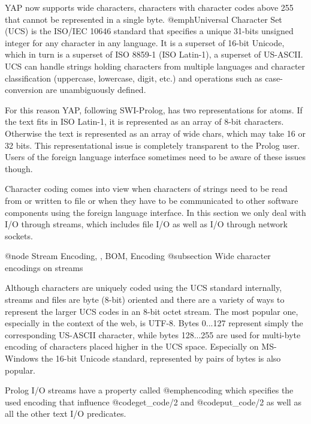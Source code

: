 {{{{YAP now  supports wide characters, characters with character
codes above 255 that cannot be represented in a single byte.
@emph{Universal Character Set} (UCS) is the ISO/IEC 10646 standard
that specifies a unique 31-bits unsigned integer for any character in
any language.  It is a superset of 16-bit Unicode, which in turn is
a superset of ISO 8859-1 (ISO Latin-1), a superset of US-ASCII.  UCS
can handle strings holding characters from multiple languages and
character classification (uppercase, lowercase, digit, etc.) and
operations such as case-conversion are unambiguously defined.

For this reason YAP, following SWI-Prolog, has two representations for
atoms. If the text fits in ISO Latin-1, it is represented as an array
of 8-bit characters.  Otherwise the text is represented as an array of
wide chars, which may take 16 or 32 bits.  This representational issue
is completely transparent to the Prolog user.  Users of the foreign
language interface sometimes need to be aware of these issues though.

Character coding comes into view when characters of strings need to be
read from or written to file or when they have to be communicated to
other software components using the foreign language interface. In this
section we only deal with I/O through streams, which includes file I/O
as well as I/O through network sockets.


@node Stream Encoding, , BOM, Encoding
@subsection Wide character encodings on streams



Although characters are uniquely coded using the UCS standard
internally, streams and files are byte (8-bit) oriented and there are a
variety of ways to represent the larger UCS codes in an 8-bit octet
stream. The most popular one, especially in the context of the web, is
UTF-8. Bytes 0...127 represent simply the corresponding US-ASCII
character, while bytes 128...255 are used for multi-byte
encoding of characters placed higher in the UCS space. Especially on
MS-Windows the 16-bit Unicode standard, represented by pairs of bytes is
also popular.

Prolog I/O streams have a property called @emph{encoding} which
specifies the used encoding that influence @code{get_code/2} and
@code{put_code/2} as well as all the other text I/O predicates.

}}}}
